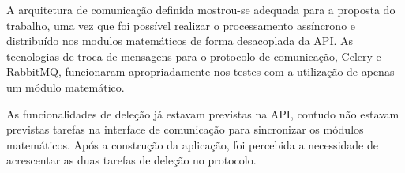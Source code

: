     A arquitetura de comunicação definida mostrou-se adequada para a proposta do trabalho, uma vez que foi possível
    realizar o processamento assíncrono e distribuído nos modulos matemáticos de forma desacoplada da API.
    As tecnologias de troca de mensagens para o protocolo de comunicação, Celery e RabbitMQ, funcionaram 
    apropriadamente nos testes com a utilização de apenas um módulo matemático. 
    
    As funcionalidades de deleção já estavam previstas na API, contudo não estavam previstas tarefas na interface
    de comunicação para sincronizar os módulos matemáticos. Após a construção da aplicação, foi percebida a necessidade de acrescentar
    as duas tarefas de deleção no protocolo.
    
    
    
    
      
      